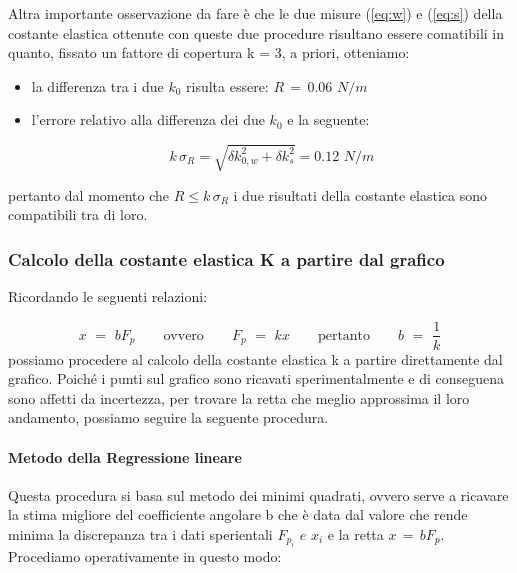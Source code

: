 Altra importante osservazione da fare è che le due misure (\ref{eq:w}) e (\ref{eq:s}) della costante elastica ottenute con queste due procedure risultano essere comatibili in quanto, fissato un fattore di copertura k = 3, a priori, otteniamo:
\begin{itemize}
	\item{la differenza tra i due $k_0$ risulta essere: $R \,=\, 0.06 \,\, N/m$}
	\item{l'errore relativo alla differenza dei due $k_0$ e la seguente:
            
        $$k \, \sigma_R = \sqrt{\delta k_{0,w}^2 + \delta k_{s}^2} = 0.12 \,\, N/m$$}
\end{itemize}
pertanto dal momento che $ R \leq k \, \sigma_R$ i due risultati della costante elastica sono compatibili tra di loro.

\subsubsection{Calcolo della costante elastica K a partire dal grafico}

Ricordando le seguenti relazioni:

\begin{equation}
    x \,\,=\,\, bF_p \qquad \text{ovvero} \qquad F_p \,\,=\,\, kx \qquad \text{pertanto} \qquad b \,\,=\,\, \frac{1}{k}
\end{equation}
%
possiamo procedere al calcolo della costante elastica k a partire direttamente dal grafico. Poiché i punti sul grafico sono ricavati sperimentalmente e di conseguena sono affetti da incertezza, per trovare la retta che meglio approssima il loro andamento, possiamo seguire la seguente procedura.

\paragraph{Metodo della Regressione lineare\\}

Questa procedura si basa sul metodo dei minimi quadrati, ovvero serve a ricavare la stima migliore del coefficiente angolare b che è data dal valore che rende minima la discrepanza tra i dati sperientali $F_{p_i} \,\,e\,\, x_i$ e la retta $x \,=\, bF_p$.\\
Procediamo operativamente in questo modo:

